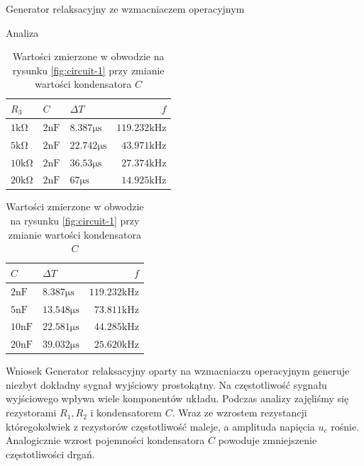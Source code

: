 \documentclass[a4paper]{scrartcl}
\begin{document}
\begin{section}{Generator relaksacyjny ze wzmacniaczem operacyjnym}
\begin{subsection}{Analiza}
				\begin{table}[!htbp]
					\begin{minipage}{0.465\linewidth}
					\centering
					\caption{Wartości zmierzone w obwodzie na rysunku \ref{fig:circuit-1} przy zmianie wartości rezystora $ R_{3} $}
					\hfill
					\begin{tabular}{| l | l | l | r |}
						\hline
						$ R_{3} $ & $ C $ & $ \Delta T $ & $ f $ \\ \hline
						$ 1\mathrm{k\Omega} $ & $ 2\mathrm{nF} $ & $ 8.387 \mathrm{\mu s} $ & $ 119.232 \mathrm{kHz} $ \\ \hline
						$ 5\mathrm{k\Omega} $ & $ 2\mathrm{nF} $ & $ 22.742 \mathrm{\mu s} $ & $ 43.971 \mathrm{kHz} $ \\ \hline
						$ 10\mathrm{k\Omega} $ & $ 2\mathrm{nF} $ & $ 36.53 \mathrm{\mu s} $ & $ 27.374 \mathrm{kHz} $ \\ \hline
						$ 20\mathrm{k\Omega} $ & $ 2\mathrm{nF} $ & $ 67 \mathrm{\mu s} $ & $ 14.925 \mathrm{kHz} $ \\ \hline
					\end{tabular}
					\end{minipage}\hfill
					\begin{minipage}{0.45\linewidth}
					\centering
					\caption{Wartości zmierzone w obwodzie na rysunku \ref{fig:circuit-1} przy zmianie wartości kondensatora $ C $}
					\hfill
					\begin{tabular}{| p{1.6cm} | l | r |}
						\hline
						$ C $ & $ \Delta T $ & $ f $ \\ \hline
						$ 2\mathrm{nF} $ & $ 8.387 \mathrm{\mu s} $ & $ 119.232 \mathrm{kHz} $ \\ \hline
						$ 5\mathrm{nF} $ & $ 13.548 \mathrm{\mu s} $ & $ 73.811 \mathrm{kHz} $ \\ \hline
						$ 10\mathrm{nF} $ & $ 22.581 \mathrm{\mu s} $ & $ 44.285 \mathrm{kHz} $ \\ \hline
						$ 20\mathrm{nF} $ & $ 39.032 \mathrm{\mu s} $ & $ 25.620 \mathrm{kHz} $ \\ \hline
					\end{tabular}
					\end{minipage}
				\end{table}
				\pagebreak
		\end{subsection}
		\begin{subsection}{Wniosek}
			Generator relaksacyjny oparty na wzmacniaczu operacyjnym generuje niezbyt dokładny sygnał wyjściowy prostokątny. Na częstotliwość sygnału wyjściowego wpływa wiele komponentów układu. Podczas analizy zajęliśmy się rezystorami $ R_{1}, R_{2} $ i kondensatorem $ C $. Wraz ze wzrostem rezystancji któregokolwiek z rezystorów częstotliwość maleje, a amplituda napięcia $ u_{c} $ rośnie. Analogicznie wzrost pojemności kondensatora $ C $ powoduje zmniejszenie częstotliwości drgań.
		\end{subsection}
	\end{section}
	\newpage
\end{document}
